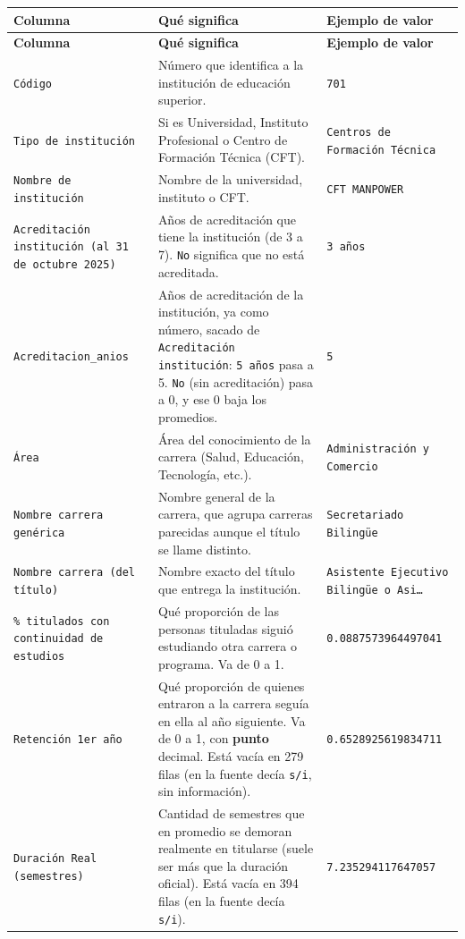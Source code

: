\documentclass[10.5pt]{article}
\newcommand{\hdr}[1]{\textbf{\color{white}#1}}
\begin{document}
\begin{xltabular}{\linewidth}{@{}p{4.5cm} >{\raggedright\arraybackslash}X p{3.4cm}@{}}
\hdr{Columna} & \hdr{Qué significa} & \hdr{Ejemplo de valor} \\
\endfirsthead
{}\hdr{Columna} & \hdr{Qué significa} & \hdr{Ejemplo de valor} \\
\endhead
\texttt{Código} & Número que identifica a la institución de educación superior. & \texttt{701} \\
\texttt{Tipo de institución} & Si es Universidad, Instituto Profesional o Centro de Formación Técnica (CFT). & \texttt{Centros de Formación Técnica} \\
\texttt{Nombre de institución} & Nombre de la universidad, instituto o CFT. & \texttt{CFT MANPOWER} \\
\texttt{Acreditación institución (al 31 de octubre 2025)} & Años de acreditación que tiene la institución (de 3 a 7). \texttt{No} significa que no está acreditada. & \texttt{3 años} \\
\texttt{Acreditacion\_\allowbreak{}anios} & Años de acreditación de la institución, ya como número, sacado de \texttt{Acreditación institución}: \texttt{5 años} pasa a 5. \texttt{No} (sin acreditación) pasa a 0, y ese 0 baja los promedios. & \texttt{5} \\
\texttt{Área} & Área del conocimiento de la carrera (Salud, Educación, Tecnología, etc.). & \texttt{Administración y Comercio} \\
\texttt{Nombre carrera genérica} & Nombre general de la carrera, que agrupa carreras parecidas aunque el título se llame distinto. & \texttt{Secretariado Bilingüe} \\
\texttt{Nombre carrera (del título)} & Nombre exacto del título que entrega la institución. & \texttt{Asistente Ejecutivo Bilingüe o Asi…} \\
\texttt{\% titulados con continuidad de estudios} & Qué proporción de las personas tituladas siguió estudiando otra carrera o programa. Va de 0 a 1. & \texttt{0.0887573964497041} \\
\texttt{Retención 1er año} & Qué proporción de quienes entraron a la carrera seguía en ella al año siguiente. Va de 0 a 1, con \textbf{punto} decimal. Está vacía en 279 filas (en la fuente decía \texttt{s/\allowbreak{}i}, sin información). & \texttt{0.6528925619834711} \\
\texttt{Duración Real (semestres)} & Cantidad de semestres que en promedio se demoran realmente en titularse (suele ser más que la duración oficial). Está vacía en 394 filas (en la fuente decía \texttt{s/\allowbreak{}i}). & \texttt{7.235294117647057} \\

\end{xltabular}
\end{document}
